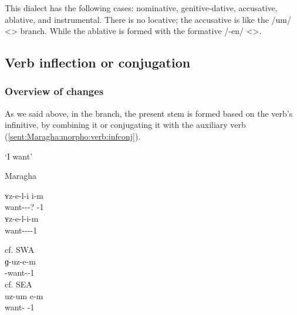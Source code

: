 This dialect has the following cases: nominative, genitive-dative, accusative, ablative, and instrumental. There is no locative; the accusative is like the /um/ <> branch. While the ablative is formed with the formative /-en/ <>. 

\subsection{Verb inflection or conjugation}

\subsubsection{Overview of changes}\label{sec:Maragha:morpho:verb:overview}

 

As we said above, in the  branch, the present stem is formed based on the verb's infinitive, by combining it or conjugating it with the auxiliary verb (\ref{sent:Maragha:morpho:verb:infconj}). 

\begin{exe}
	\ex `I want' \label{sent:Maragha:morpho:verb:infconj} \begin{xlist}
		\ex Maragha
		\begin{xlist}
			\ex \gll ʏz-e-l-i i-m \\
			want-{\thgloss}-{\infgloss}-{\impfcvb}? {\aux}-1{\sg} \\
			\trans {} \label{sent:Maragha:morpho:verb:infconj:base} 
			\ex \gll ʏz-e-l-i-m \\
			want-{\thgloss}-{\infgloss}-{\aux}-1{\sg} \\
			\trans {} \label{sent:Maragha:morpho:verb:infconj:merged} 
		\end{xlist}
		\ex cf. SWA \\
		\gll ɡ-uz-e-m \\
		{\ind}-want-{\thgloss}-1{\sg} \\
		\trans {}
		\ex cf. SEA \\
		\gll uz-um e-m \\
		want-{\impfcvb} {\aux}-1{\sg} \\
		\trans {}
	\end{xlist}
	
\end{exe}


\begin{adjarianpage}\label{page:283}\end{adjarianpage}%


